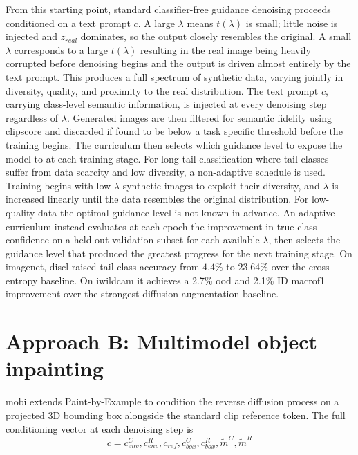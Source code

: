 From this starting point, standard classifier-free guidance denoising proceeds conditioned on a text prompt $c$. A large $\lambda$ means $t(\lambda)$ is small; little noise is injected and $z_{real}$ dominates, 
so the output closely resembles the original. A small $\lambda$ corresponds to a large $t(\lambda)$ resulting in the real image being heavily corrupted before denoising begins and the output is driven almost 
entirely by the text prompt. This produces a full spectrum of synthetic data, varying jointly in diversity, quality, and proximity to the real distribution. The text prompt $c$, carrying class-level semantic 
information, is injected at every denoising step regardless of $\lambda$. Generated images are then filtered for semantic fidelity using \gls{clipscore} and discarded if found to be below a task specific 
threshold before the training begins. The curriculum then selects which guidance level to expose the model to at each training stage. For long-tail classification where tail classes suffer from data scarcity 
and low diversity, a non-adaptive schedule is used. Training begins with low $\lambda$ synthetic images to exploit their diversity, and $\lambda$ is increased linearly until the data resembles the original 
distribution. For low-quality data the optimal guidance level is not known in advance. An adaptive curriculum instead evaluates at each epoch the improvement in true-class confidence on a held out 
validation subset for each available $\lambda$, then selects the guidance level that produced the greatest progress for the next training stage.
On \gls{imagenet}, \gls{discl} raised tail-class accuracy from $4.4\%$ to $23.64\%$ over the cross-entropy baseline. On \gls{iwildcam} it achieves a 2.7\% \gls{ood} and 2.1\% ID \gls{macrof1} improvement over the strongest diffusion-augmentation baseline. 

\section{Approach B: Multimodel object inpainting}
\gls{mobi}\cite{mobi} extends Paint-by-Example to condition the reverse diffusion process on a projected 3D bounding box alongside the standard \gls{clip} reference token. The full conditioning vector at each denoising step is
\begin{equation}
    \label{eq:mobi-conditioning}
    c = {c_{env}^C, c_{env}^R, c_{ref}, c_{box}^C, c_{box}^R, \tilde{m}^C, \tilde{m}^R}
\end{equation}

